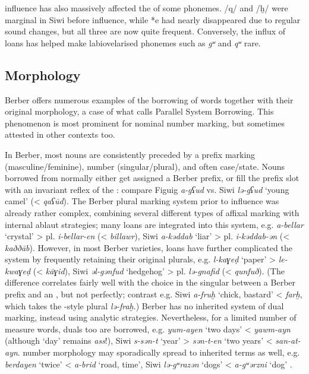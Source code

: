 \documentclass[output=paper]{langsci/langscibook}
\begin{document}
 influence has also massively affected the  of some phonemes. /q/ and /ḫ/ were marginal in Siwi before  influence, while *e had nearly disappeared due to regular sound changes, but all three are now quite frequent. Conversely, the influx of  loans has helped make labiovelarised phonemes such as \textit{gʷ} and \textit{qʷ} rare.


 
 \subsection{Morphology} \label{morph}


Berber offers numerous examples of the borrowing of  words together with their original   morphology, a case of what \citet{Kossmann2010} calls Parallel System Borrowing. This phenomenon is most prominent for nominal number marking, but sometimes attested in other contexts too.

In Berber, most nouns are consistently preceded by a prefix marking  (masculine/feminine), number (singular/plural), and often case/state. Nouns borrowed from  normally either get assigned a Berber prefix, or fill the prefix slot with an invariant reflex of the   : compare Figuig \textit{a-gʕud} vs. Siwi \textit{lə-gʕud} `young camel' (< \textit{qaʕūd}). The Berber plural marking system prior to  influence was already rather complex, combining several different types of affixal marking with internal ablaut strategies; many  loans are integrated into this system, e.g.  \textit{a-bellar} `crystal' > pl. \textit{i-bellar-en} (< \textit{billawr}), Siwi \textit{a-kəddab} `liar' > pl. \textit{i-kəddab-ən} (< \textit{kaððāb}). However, in most Berber varieties,  loans have further complicated the system by frequently retaining their original plurals, e.g.  \textit{l-kaɣeḍ} `paper' > \textit{le-kwaɣeḍ} (< \textit{kāɣid}), Siwi \textit{əl-gənfud} `hedgehog' > pl. \textit{lə-gnafid} (< \textit{qunfuð}). (The difference correlates fairly well with the choice in the singular between a Berber prefix and an  , but not perfectly; contrast e.g. Siwi \textit{a-fruḫ} `chick, bastard' < \textit{farḫ}, which takes the -style plural \textit{lə-fraḫ}.)  Berber has no inherited system of dual marking, instead using analytic strategies. Nevertheless, for a limited number of measure words, duals too are borrowed, e.g.  \textit{yum-ayen} `two days' < \textit{yawm-ayn} (although `day' remains \textit{ass}!), Siwi \textit{s-sən-t} `year' > \textit{sən-t-en} `two years' < \textit{san-at-ayn}.   number morphology may sporadically spread to inherited terms as well, e.g.  \textit{berdayen} `twice' < \textit{a-brid} `road, time', Siwi \textit{lə-gʷrazən} `dogs' < \textit{a-gʷərzni} `dog' \citep{Souag2013book}.
\end{document}
